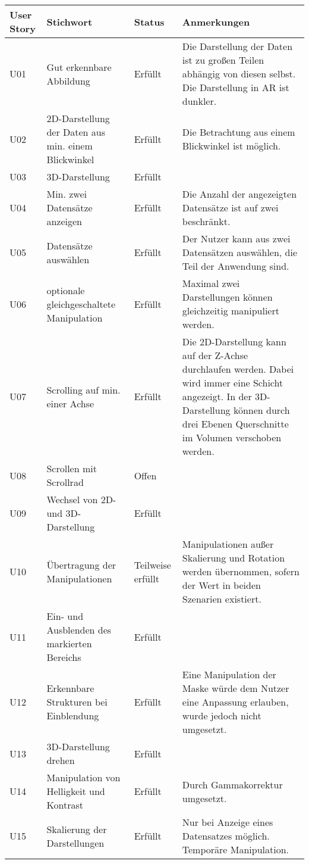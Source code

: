 \begin{longtable}{p{}p{}C{.1\textwidth}p{.52\textwidth}}
\toprule
User Story & Stichwort & Status & Anmerkungen \\
\toprule
U01 & Gut erkennbare Abbildung & Erfüllt & Die Darstellung der Daten ist zu großen Teilen abhängig von diesen selbst. Die Darstellung in AR ist dunkler.\\
\midrule 
U02 & 2D-Darstellung der Daten aus min. einem Blickwinkel & Erfüllt & Die Betrachtung aus einem Blickwinkel ist möglich.\\
\midrule 
U03 & 3D-Darstellung & Erfüllt & \\
\midrule 
U04 & Min. zwei Datensätze anzeigen & Erfüllt & Die Anzahl der angezeigten Datensätze ist auf zwei beschränkt.\\
\midrule 
U05 & Datensätze auswählen & Erfüllt & Der Nutzer kann aus zwei Datensätzen auswählen, die Teil der Anwendung sind.\\
\midrule
U06 & optionale gleichgeschaltete Manipulation & Erfüllt & Maximal zwei Darstellungen können gleichzeitig manipuliert werden. \\
\midrule 
U07 & Scrolling auf min. einer Achse & Erfüllt & Die 2D-Darstellung kann auf der Z-Achse durchlaufen werden. Dabei wird immer eine Schicht angezeigt. In der 3D-Darstellung können durch drei Ebenen Querschnitte im Volumen verschoben werden.\\
\midrule 
U08 & Scrollen mit Scrollrad & Offen & \\
\midrule 
U09 & Wechsel von 2D- und 3D-Darstellung & Erfüllt & \\
\midrule 
U10 & Übertragung der Manipulationen & Teilweise erfüllt & Manipulationen außer Skalierung und Rotation werden übernommen, sofern der Wert in beiden Szenarien existiert.\\
\midrule 
U11  & Ein- und Ausblenden des markierten Bereichs & Erfüllt & \\
\midrule
U12 & Erkennbare Strukturen bei Einblendung & Erfüllt & Eine Manipulation der Maske würde dem Nutzer eine Anpassung erlauben, wurde jedoch nicht umgesetzt.\\
\midrule 
U13 & 3D-Darstellung drehen & Erfüllt & \\
\midrule 
U14 & Manipulation von Helligkeit und Kontrast & Erfüllt & Durch Gammakorrektur umgesetzt.\\
\midrule 
U15 & Skalierung der Darstellungen & Erfüllt & Nur bei Anzeige eines Datensatzes möglich. Temporäre Manipulation.\\

\end{longtable}
